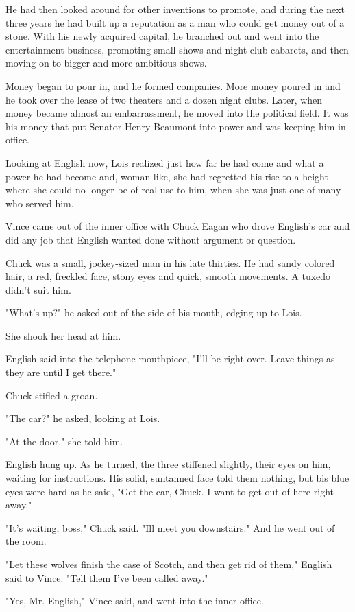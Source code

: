 \documentclass{novel}
\begin{document}
He had then looked around for other inventions to promote, and during the next three years he had built up a reputation as a man who could get money out of a stone. With his newly acquired capital, he branched out and went into the entertainment business, promoting small shows and night-club cabarets, and then moving on to bigger and more ambitious shows.

Money began to pour in, and he formed companies. More money poured in and he took over the lease of two theaters and a dozen night clubs. Later, when money became almost an embarrassment, he moved into the political field. It was his money that put Senator Henry Beaumont into power and was keeping him in office.

Looking at English now, Lois realized just how far he had come and what a power he had become and, woman-like, she had regretted his rise to a height where she could no longer be of real use to him, when she was just one of many who served him.

Vince came out of the inner office with Chuck Eagan who drove English's car and did any job that English wanted done without argument or question.

Chuck was a small, jockey-sized man in his late thirties. He had sandy colored hair, a red, freckled face, stony eyes and quick, smooth movements. A tuxedo didn't suit him.

"What's up?" he asked out of the side of bis mouth, edging up to Lois.

She shook her head at him.

English said into the telephone mouthpiece, "I'll be right over. Leave things as they are until I get there."

Chuck stifled a groan.

"The car?" he asked, looking at Lois.

"At the door," she told him.

English hung up. As he turned, the three stiffened slightly, their eyes on him, waiting for instructions. His solid, suntanned face told them nothing, but bis blue eyes were hard as he said, "Get the car, Chuck. I want to get out of here right away."

"It's waiting, boss," Chuck said. "Ill meet you downstairs." And he went out of the room.

"Let these wolves finish the case of Scotch, and then get rid of them," English said to Vince. "Tell them I've been called away."

"Yes, Mr. English," Vince said, and went into the inner office.
\end{document}
